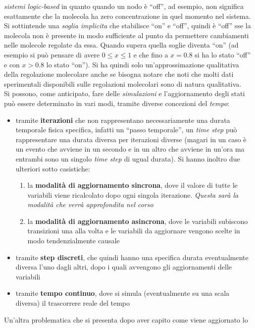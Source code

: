 \documentclass[a4paper,12pt, oneside]{book}
\begin{document}
\textit{sistemi logic-based} in quanto quando un nodo è ``off'', ad esempio, non
significa esattamente che la molecola ha zero concentrazione in quel momento nel
sistema. Si sottintende una \textit{soglia implicita} che stabilisce ``on''  e
``off'', quindi è ``off'' sse la molecola non è presente in modo
sufficiente al punto da permettere cambiamenti nelle molecole regolate da
essa. Quando supera quella soglie diventa ``on'' (ad esempio si può pensare di
avere $0\leq x\leq 1$ e che fino a $x=0.8$ si ha lo stato ``off'' e con $x>0.8$
lo stato ``on''). Si ha quindi solo
un'approssimazione qualitativa della regolazione molecolare anche se bisogna
notare che noti che molti dati sperimentali disponibili sulle regolazioni
molecolari sono di natura qualitativa. \\
Si possono, come anticipato, fare delle \textit{simulazioni} e l'aggiornamento
degli stati può essere determinato in vari modi, tramite diverse concezioni del \textit{tempo}:
\begin{itemize}
  \item tramite \textbf{iterazioni} che non rappresentano necessariamente una
  durata temporale fisica specifica, infatti un ``passo temporale'', un
  \textit{time step} può rappresentare una durata diversa per iterazioni diverse
  (magari in un caso è un evento che avviene in un secondo e in un altro che
  avviene in un'ora ma entrambi sono un singolo \textit{time step} di ugual
  durata). Si hanno inoltro due ulteriori sotto casistiche:
  \begin{enumerate}
    \item la \textbf{modalità di aggiornamento sincrona}, dove il valore di
    tutte le variabili viene ricalcolato dopo ogni singola
    iterazione. \textit{Questa sarà la modalità che verrà approfondita nel
      corso}  
    \item la \textbf{modalità di aggiornamento asincrona}, dove le variabili
    subiscono transizioni una alla volta e le variabili da aggiornare vengono
    scelte in modo tendenzialmente causale
  \end{enumerate}
  \item tramite \textbf{step discreti}, che quindi hanno una specifica durata
  eventualmente diversa l'uno dagli altri, dopo i quali avvengono gli
  aggiornamenti delle variabili
  \item tramite \textbf{tempo continuo}, dove si simula (eventualmente su una
  scala diversa) il trascorrere reale del tempo
\end{itemize}
Un'altra problematica che si presenta dopo aver capito come viene aggiornato lo
\end{document}
